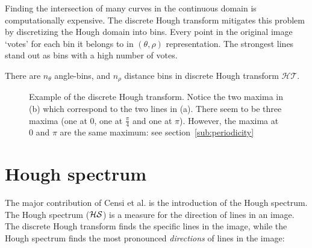 Finding the intersection of many curves in the continuous domain is computationally expensive. The discrete Hough transform mitigates this problem by discretizing the Hough domain into bins. Every point in the original image `votes' for each bin it belongs to in $(\theta, \rho)$ representation. The strongest lines stand out as bins with a high number of votes.

There are $n_\theta$ angle-bins, and $n_\rho$ distance bins in discrete Hough transform $\mathcal{HT}$. 

\begin{figure}[ht]
\centering
{}
\caption{Example of the discrete Hough transform. Notice the two maxima in (b) which correspond to the two lines in (a). There seem to be three maxima (one at $0$, one at $\frac{\pi}{4}$ and one at $\pi$). However, the maxima at $0$ and $\pi$ are the same maximum: see section~\ref{sub:periodicity}}
\label{fig:lines}
\end{figure}


\section{Hough spectrum}
The major contribution of Censi et al.\cite{censi2005scan} is the introduction of the Hough spectrum. The Hough spectrum ($\cal HS$) is a measure for the direction of lines in an image. The discrete Hough transform finds the specific lines in the image, while the Hough spectrum finds the most pronounced \emph{directions} of lines in the image:

